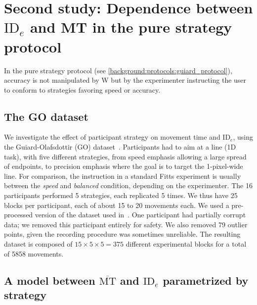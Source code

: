 \documentclass[acmlarge, manuscript,review]{acmart}
\newcommand{\mmt}{\ensuremath{\overline{\mt}}\xspace}
\newcommand{\mt}{\ensuremath{{\text{MT}}}\xspace}
\newcommand{\ide}{\ensuremath{{\text{ID}_e}}\xspace}
\begin{document}
\section{Second study: Dependence between \ide and MT in the pure strategy protocol \label{sec:gop}}
In the pure strategy protocol (see \autoref{background:protocols:guiard_protocol}), accuracy is not manipulated by W but by the experimenter instructing the user to conform to strategies favoring speed or accuracy. 

\subsection{The GO dataset}
We investigate the effect of participant strategy on movement time and \ide, using the Guiard-Olafsdottir (GO) dataset~\cite{guiard2011}.
Participants had to aim at a line (1D task), with five different strategies, from speed emphasis allowing a large spread of endpoints, to precision emphasis where the goal is to target the 1-pixel-wide line. 
For comparison, the instruction in a standard Fitts experiment is usually between the \textit{speed} and \textit{balanced} condition, depending on the experimenter.
The 16 participants performed 5 strategies, each replicated 5 times. We thus have 25 blocks per participant, each of about 15 to 20 movements each. 
We used a pre-processed version of the dataset used in~\cite{gori2020}. One participant had partially corrupt data; we removed this participant entirely for safety. We also removed 79 outlier points, given the recording procedure was sometimes unreliable. The resulting dataset is composed of $15 \times 5 \times 5 = 375$ different experimental blocks for a total of 5858 movements.




\subsection{A model between \mmt and \ide parametrized by strategy}
\end{document}
